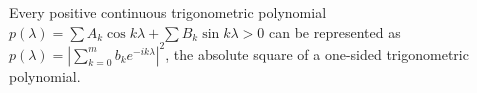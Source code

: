 Every positive continuous trigonometric polynomial $p(\lambda) = \sum A_k \cos k\lambda + \sum B_k \sin k\lambda > 0$ can be represented as $p(\lambda) = |\sum_{k=0}^m b_k e^{-ik\lambda}|^2$, the absolute square of a one-sided trigonometric polynomial.
